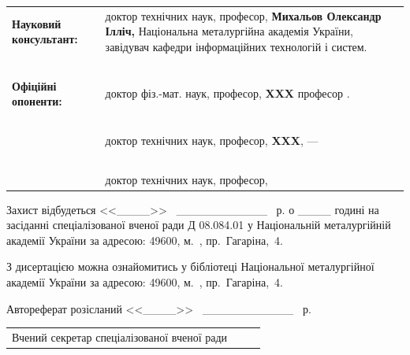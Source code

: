 \documentclass[a4paper,13pt]{atuaref}
\renewcommand{\SekrRadi}{\dissSekrRadi}
\begin{document}
\noindent
\begin{tabular}{lp{}}
\textbf{Науковий консультант:}
&
доктор технічних наук, професор,\newline
\textbf{Михальов Олександр Ілліч,}\newline
Національна металургійна академія України,
завідувач кафедри інформаційних технологій і систем.
\\
{~} & {~}
\\
\textbf{Офіційні опоненти:}
{~}
&
доктор фіз.-мат. наук, професор,\newline
\textbf{XXX}
професор .
\\
{~} & {~}
\\
&
доктор технічних наук, професор,\newline
\textbf{XXX},
  ---
\\
{~} & {~}
\\
{~}
&
доктор технічних наук, професор,\newline
\end{tabular}

\vspace{5ex plus 4ex}


\vfill

Захист відбудеться
<<\_\_\_\_>>
~\_\_\_\_\_\_\_\_\_\_\_
\bookyear~р. о \_\_\_\_ годині
на засіданні спеціалізованої вченої ради Д 08.084.01 у Національній
металургійній академії України за адресою: 49600, м.~\cityUa,
пр.~Гагаріна,~4.


\vspace{4ex plus 3ex}
З дисертацією можна ознайомитись у бібліотеці Національної металургійної
академії України за адресою: 49600, м.~\cityUa, пр.~Гагаріна,~4.

\vspace{4ex plus 3ex}
Автореферат розісланий 
<<\_\_\_\_>>
~\_\_\_\_\_\_\_\_\_\_\_
\bookyear~р.

\vspace{4ex plus 3ex}

\begin{tabular}{p{}p{}p{}}
Вчений секретар спеціалізованої вченої ради 
&
{~}
&
\SekrRadi
\end{tabular}

\vspace{2ex}
\end{document}
